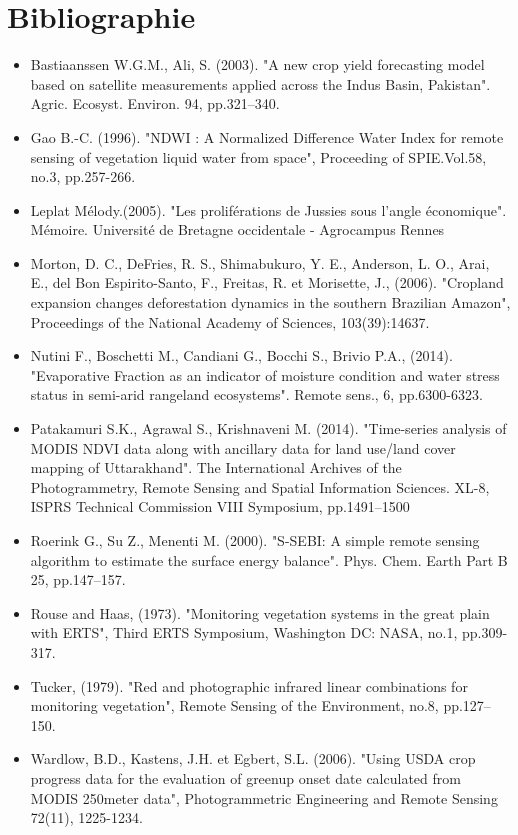 \documentclass[10pt,a4paper]{article}
\begin{document}
\section{Bibliographie}

\begin{itemize}
\item Bastiaanssen W.G.M., Ali, S. (2003). "A new crop yield forecasting model based on satellite measurements applied across the Indus Basin, Pakistan". Agric. Ecosyst. Environ. 94, pp.321–340.
\item Gao B.-C. (1996). "NDWI : A  Normalized  Difference  Water  Index  for  remote  sensing  of vegetation liquid water from space", Proceeding of SPIE.Vol.58, no.3, pp.257-266.
\item Leplat Mélody.(2005). "Les proliférations de Jussies sous l'angle économique". Mémoire. Université de Bretagne occidentale - Agrocampus Rennes
\item Morton, D. C., DeFries, R. S., Shimabukuro, Y. E., Anderson, L. O., Arai, E., del Bon Espirito-Santo, F.,  Freitas,  R.  et  Morisette,  J.,  (2006). "Cropland expansion changes deforestation dynamics in the southern Brazilian Amazon", Proceedings of the National Academy of Sciences, 103(39):14637. 
\item Nutini F., Boschetti M., Candiani G., Bocchi S., Brivio P.A., (2014). "Evaporative Fraction as an indicator of moisture condition and water stress status in semi-arid rangeland ecosystems". Remote sens., 6, pp.6300-6323.
\item Patakamuri S.K., Agrawal S., Krishnaveni M. (2014). "Time-series analysis of MODIS NDVI data along with ancillary data for land use/land cover mapping of Uttarakhand". The International Archives of the Photogrammetry, Remote Sensing and Spatial Information Sciences. XL-8, ISPRS Technical Commission VIII Symposium, pp.1491–1500
\item Roerink G., Su Z., Menenti M. (2000). "S-SEBI: A simple remote sensing algorithm to estimate the surface energy balance". Phys. Chem. Earth Part B 25, pp.147–157.
\item Rouse and Haas, (1973). "Monitoring vegetation systems in the great plain with ERTS", Third ERTS Symposium, Washington DC: NASA, no.1, pp.309-317.
\item Tucker, (1979). "Red and photographic infrared linear combinations for monitoring vegetation", Remote Sensing of the Environment, no.8, pp.127–150. 
\item Wardlow, B.D., Kastens, J.H. et Egbert, S.L. (2006). "Using USDA crop progress data for the evaluation of greenup onset date calculated from MODIS 250meter data", Photogrammetric Engineering and Remote Sensing 72(11), 1225-1234. 
\end{itemize}
\end{document}
